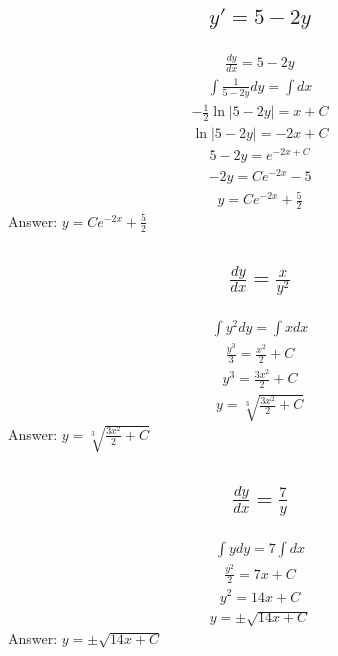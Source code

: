 \documentclass{article}
\begin{document}
\subsection{
	\begin{align*}
		y' = 5 - 2y
	\end{align*}
}
\begin{align*}
	\frac{dy}{dx} = 5 - 2y
\end{align*}
\begin{align*}
	\int {\frac{1}{5 - 2y}}dy = \int dx
\end{align*}
\begin{align*}
	-\frac{1}{2} \ln{|5 - 2y|} = x + C
\end{align*}
\begin{align*}
	\ln{|5 - 2y|} = -2x + C
\end{align*}
\begin{align*}
	5 - 2y = e^{-2x + C}
\end{align*}
\begin{align*}
	-2y = Ce^{-2x} - 5
\end{align*}
\begin{align*}
	y = Ce^{-2x} + \frac{5}{2}
\end{align*}
Answer: $y = Ce^{-2x} + \frac{5}{2}$

\subsection{
	\begin{align*}
		\frac{dy}{dx} = \frac{x}{y^2}
	\end{align*}
}
\begin{align*}
	\int {y^2}dy = \int{x}dx
\end{align*}
\begin{align*}
	\frac{y^3}{3} = \frac{x^2}{2} + C
\end{align*}
\begin{align*}
	y^3 = \frac{3x^2}{2} + C
\end{align*}
\begin{align*}
	y = \sqrt[3]{\frac{3x^2}{2} + C}
\end{align*}
Answer: $y = \sqrt[3]{\frac{3x^2}{2} + C}$

\subsection{
	\begin{align*}
		\frac{dy}{dx} = \frac{7}{y}
	\end{align*}
}
\begin{align*}
	\int{y}dy = 7\int dx
\end{align*}
\begin{align*}
	\frac{y^2}{2} = 7x + C
\end{align*}
\begin{align*}
	y^2 = 14x + C
\end{align*}
\begin{align*}
	y = \pm \sqrt{14x + C}
\end{align*}
Answer: $y = \pm \sqrt{14x + C}$
\end{document}
